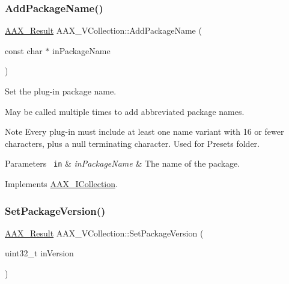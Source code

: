 \subsubsection{\texorpdfstring{AddPackageName()}{AddPackageName()}}
{\footnotesize\ttfamily \mbox{\hyperlink{a00392_a4d8f69a697df7f70c3a8e9b8ee130d2f}{A\+A\+X\+\_\+\+Result}} A\+A\+X\+\_\+\+V\+Collection\+::\+Add\+Package\+Name (\begin{DoxyParamCaption}\item[{const char $\ast$}]{in\+Package\+Name }\end{DoxyParamCaption})\hspace{0.3cm}{\ttfamily [virtual]}}



Set the plug-\/in package name. 

May be called multiple times to add abbreviated package names.

\begin{DoxyNote}{Note}
Every plug-\/in must include at least one name variant with 16 or fewer characters, plus a null terminating character. Used for Presets folder.
\end{DoxyNote}

\begin{DoxyParams}[1]{Parameters}
\mbox{\texttt{ in}}  & {\em in\+Package\+Name} & The name of the package. \\
\hline
\end{DoxyParams}


Implements \mbox{\hyperlink{a01777_acf7410e0d06cf64bea36bf7d18b3456c}{A\+A\+X\+\_\+\+I\+Collection}}.

\mbox{\label{a01897_a8c070ce17b8af89de1fbf543d746635c}} 
\subsubsection{\texorpdfstring{SetPackageVersion()}{SetPackageVersion()}}
{\footnotesize\ttfamily \mbox{\hyperlink{a00392_a4d8f69a697df7f70c3a8e9b8ee130d2f}{A\+A\+X\+\_\+\+Result}} A\+A\+X\+\_\+\+V\+Collection\+::\+Set\+Package\+Version (\begin{DoxyParamCaption}\item[{uint32\+\_\+t}]{in\+Version }\end{DoxyParamCaption})\hspace{0.3cm}{\ttfamily [virtual]}}



